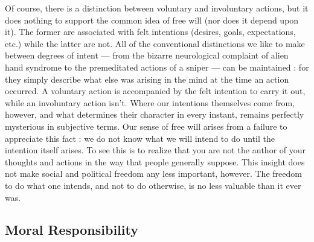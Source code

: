 \documentclass[a4paper,14pt]{extarticle}
\begin{document}
Of course, there is a distinction between voluntary and involuntary actions, but it does nothing to support the common idea of free will (nor does it depend upon it).
The former are associated with felt intentions (desires, goals, expectations, etc.) while the latter are not.
All of the conventional distinctions we like to make between degrees of intent --- from the bizarre neurological complaint of alien hand syndrome to the premeditated actions of a sniper --- can be maintained :
for they simply describe what else was arising in the mind at the time an action occurred.
A voluntary action is accompanied by the felt intention to carry it out, while an involuntary action isn’t.
Where our intentions themselves come from, however, and what determines their character in every instant, remains perfectly mysterious in subjective terms.
Our sense of free will arises from a failure to appreciate this fact :
we do not know what we will intend to do until the intention itself arises.
To see this is to realize that you are not the author of your thoughts and actions in the way that people generally suppose.
This insight does not make social and political freedom any less important, however.
The freedom to do what one intends, and not to do otherwise, is no less valuable than it ever was.

\subsection{Moral Responsibility}
\end{document}
